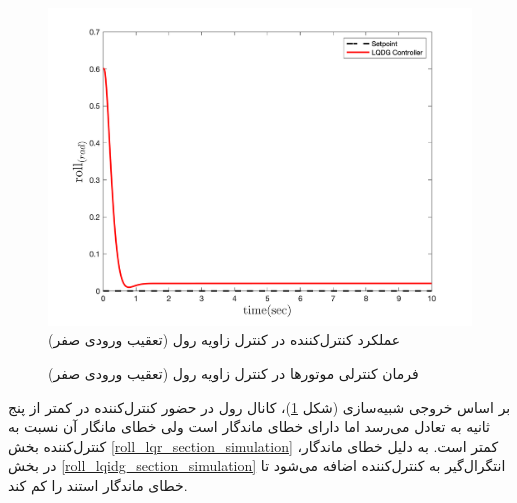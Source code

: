\begin{figure}[H]
	\includegraphics[width=.48\linewidth]{../Figures/MIL/LQDG/Roll/lqdg_roll_nn.png}
	\centering
	\caption{عملكرد کنترل‌کننده  در کنترل زاويه رول (تعقیب ورودی صفر)}
	\label{lqdg_roll_fig_simulation}
\end{figure}
\begin{figure}[H]
	\centering
	\caption{‫‪فرمان کنترلی موتورها در کنترل زاویه رول (تعقیب ورودی صفر)}
\end{figure}

بر اساس خروجی شبیه‌سازی (شکل
\ref{lqdg_roll_fig_simulation})،
کانال رول در حضور کنترل‌کننده  در کمتر از پنج ثانیه به تعادل می‌رسد اما دارای خطای ماندگار است ولی خطای 
مانگار آن نسبت به کنترل‌کننده
بخش
\ref{roll_lqr_section_simulation}
کمتر است. به دلیل خطای ماندگار، در بخش
\ref{roll_lqidg_section_simulation}
انتگرال‌گیر به کنترل‌کننده اضافه می‌شود تا خطای ماندگار استند را کم کند.
